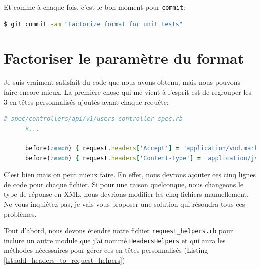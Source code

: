 \documentclass[]{report}
\begin{document}
    Et comme à chaque fois, c'est le bon moment pour \verb|commit|:

    \begin{scriptsize}
      \begin{lstlisting}[language=bash]
      $ git commit -am "Factorize format for unit tests"
      \end{lstlisting}
    \end{scriptsize}

  \section{Factoriser le paramètre du format}

    Je suis vraiment satisfait du code que nous avons obtenu, mais nous pouvons faire encore mieux. La première chose qui me vient à l'esprit est de regrouper les 3 en-têtes personnalisés ajoutés avant chaque requête:

    \begin{scriptsize}
      \begin{lstlisting}[language=ruby]
      # spec/controllers/api/v1/users_controller_spec.rb
      #...

      before(:each) { request.headers['Accept'] = "application/vnd.marketplace.v1, application/json" }
      before(:each) { request.headers['Content-Type'] = 'application/json' }
      \end{lstlisting}
    \end{scriptsize}

    C'est bien mais on peut mieux faire. En effet, nous devrons ajouter ces cinq lignes de code pour chaque fichier. Si pour une raison quelconque, nous changeons le type de réponse en XML, nous devrions modifier les cinq fichiers manuellement. Ne vous inquiétez pas, je vais vous proposer une solution qui résoudra tous ces problèmes.

    Tout d'abord, nous devons étendre notre fichier \verb|request_helpers.rb| pour inclure un autre module que j'ai nommé \verb|HeadersHelpers| et qui aura les méthodes nécessaires pour gérer ces en-têtes personnalisés (Listing \ref{lst:add_headers_to_request_helpers})
\end{document}
